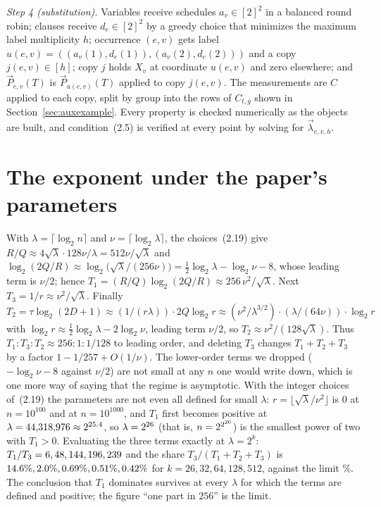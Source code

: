 \documentclass[11pt]{article}
\theoremstyle{definition}
\theoremstyle{remark}
\begin{document}
\emph{Step 4 (substitution).} Variables receive schedules $a_v \in [2]^2$ in a balanced round robin; clauses receive $d_e \in [2]^2$ by a greedy choice that minimizes the maximum label multiplicity $h$; occurrence $(e, v)$ gets label $u(e,v) = ((a_v(1), d_e(1)), (a_v(2), d_e(2)))$ and a copy $j(e,v) \in [h]$; copy $j$ holds $X_v$ at coordinate $u(e,v)$ and zero elsewhere; and $\vec P_{e,v}(T)$ is $\vec P_{u(e,v)}(T)$ applied to copy $j(e,v)$. The measurements are $C$ applied to each copy, split by group into the rows of $C_{t,g}$ shown in Section~\ref{sec:auxexample}. Every property is checked numerically as the objects are built, and condition~(2.5) is verified at every point by solving for $\vec\lambda_{e,v,h}$.

\section{The exponent under the paper's parameters}\label{app:exponent}

With $\lambda = \lceil \log_2 n \rceil$ and $\nu = \lceil \log_2 \lambda \rceil$, the choices~(2.19) give $R/Q \approx 4\sqrt{\lambda} \cdot 128\nu/\lambda = 512\nu/\sqrt{\lambda}$ and $\log_2(2Q/R) \approx \log_2\bigl(\sqrt{\lambda}/(256\nu)\bigr) = \tfrac12 \log_2 \lambda - \log_2 \nu - 8$, whose leading term is $\nu/2$; hence $T_1 = (R/Q)\log_2(2Q/R) \approx 256\,\nu^2/\sqrt{\lambda}$. Next $T_3 = 1/r \approx \nu^2/\sqrt{\lambda}$. Finally $T_2 = \tau \log_2(2D + 1) \approx (1/(r\lambda)) \cdot 2Q \log_2 r \approx (\nu^2/\lambda^{3/2}) \cdot (\lambda/(64\nu)) \cdot \log_2 r$ with $\log_2 r \approx \tfrac12 \log_2 \lambda - 2\log_2 \nu$, leading term $\nu/2$, so $T_2 \approx \nu^2/(128\sqrt{\lambda})$. Thus $T_1 : T_3 : T_2 \approx 256 : 1 : 1/128$ to leading order, and deleting $T_3$ changes $T_1 + T_2 + T_3$ by a factor $1 - 1/257 + O(1/\nu)$. The lower-order terms we dropped ($-\log_2\nu - 8$ against $\nu/2$) are not small at any $n$ one would write down, which is one more way of saying that the regime is asymptotic. With the integer choices of~(2.19) the parameters are not even all defined for small $\lambda$: $r = \lfloor \sqrt{\lambda}/\nu^2 \rfloor$ is $0$ at $n = 10^{100}$ and at $n = 10^{1000}$, and $T_1$ first becomes positive at $\lambda = 44{,}318{,}976 \approx 2^{25.4}$, so $\lambda = 2^{26}$ (that is, $n = 2^{2^{26}}$) is the smallest power of two with $T_1 > 0$. Evaluating the three terms exactly at $\lambda = 2^k$: $T_1/T_3 = 6, 48, 144, 196, 239$ and the share $T_3/(T_1 + T_2 + T_3)$ is $14.6\%, 2.0\%, 0.69\%, 0.51\%, 0.42\%$ for $k = 26, 32, 64, 128, 512$, against the limit \expShareLimit\%. The conclusion that $T_1$ dominates survives at every $\lambda$ for which the terms are defined and positive; the figure ``one part in $256$'' is the limit.
\end{document}
